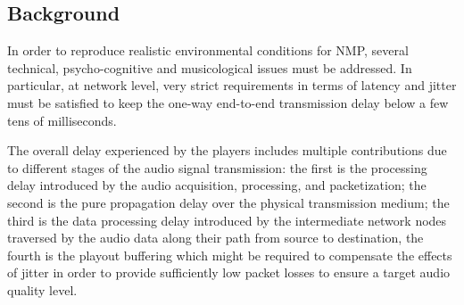 \subsection{Background}\label{sec:NMP:background}
In order to reproduce realistic environmental conditions for NMP, several technical, psycho-cognitive and musicological issues must be addressed. In particular, at network level, very strict requirements in terms of latency and jitter must be satisfied to keep the one-way end-to-end transmission delay below a few tens of milliseconds. 

The overall delay experienced by the players includes multiple contributions due to different stages of the audio signal transmission: the first is the processing delay introduced by the audio acquisition, processing, and packetization; the second is the pure propagation delay over the physical transmission medium; the third is the data processing delay introduced by the intermediate network nodes traversed by the audio data along their path from source to destination, the fourth is the playout buffering which might be required to compensate the effects of jitter in order to provide sufficiently low packet losses to ensure a target audio quality level.


